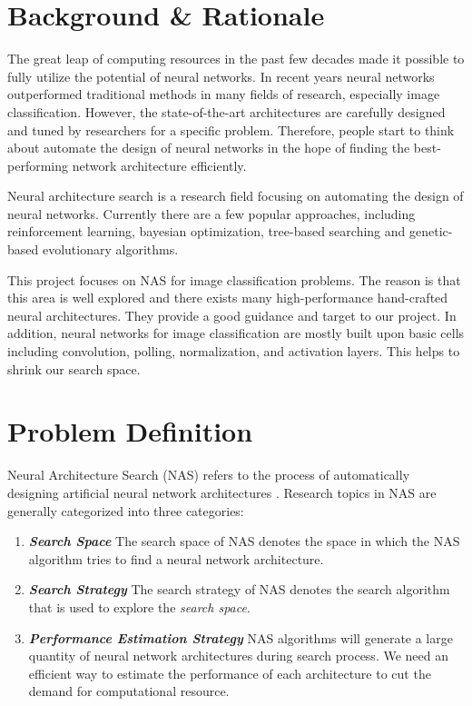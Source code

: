 \documentclass{article}
\begin{document}
    \begin{normalsize}
    
    	
      
		\section{Background \& Rationale}
        
      The great leap of computing resources in the past few decades made it possible to fully utilize the potential of neural networks. In recent years neural networks outperformed traditional methods in many fields of research, especially image classification. However, the state-of-the-art architectures are carefully designed and tuned by researchers for a specific problem. Therefore, people start to think about automate the design of neural networks in the hope of finding the best-performing network architecture efficiently.

      Neural architecture search is a research field focusing on automating the design of neural networks. Currently there are a few popular approaches, including reinforcement learning, bayesian optimization, tree-based searching and genetic-based evolutionary algorithms. 

      This project focuses on NAS for image classification problems. The reason is that this area is well explored and there exists many high-performance hand-crafted neural architectures. They provide a good guidance and target to our project. In addition, neural networks for image classification are mostly built upon basic cells including convolution, polling, normalization, and activation layers. This helps to shrink our search space.
    
    \section{Problem Definition}
      Neural Architecture Search (NAS) refers to the process of automatically designing artificial neural network architectures \cite{elsken2018neural}. Research topics in NAS are generally categorized into three categories:
      \begin{enumerate}
        \item \textbf{\emph{Search Space}}
         The search space of NAS denotes the space in which the NAS algorithm tries to find a neural network architecture.
        \item \textbf{\emph{Search Strategy}} The search strategy of NAS denotes the search algorithm that is used to explore the \emph{search space}.
        \item \textbf{\emph{Performance Estimation Strategy}} NAS algorithms will generate a large quantity of neural network architectures during search process. We need an efficient way to estimate the performance of each architecture to cut the demand for computational resource. 
      \end{enumerate}


\end{normalsize}
\end{document}
